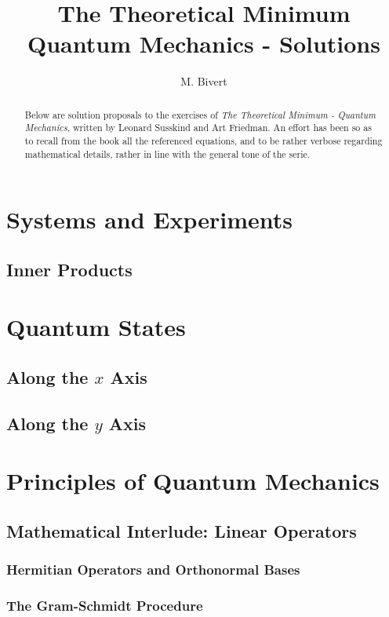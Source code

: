 \documentclass[a4paper]{article}
\author{M. Bivert}
\title{The Theoretical Minimum \\
	{\Large Quantum Mechanics - Solutions}
}
\begin{document}
\maketitle
\begin{abstract}
Below are solution proposals to the exercises of
\textit{The Theoretical Minimum - Quantum Mechanics}, written
by Leonard Susskind and Art Friedman. An effort has been
so as to recall from the book all the referenced equations,
and to be rather verbose regarding mathematical details, rather
in line with the general tone of the serie.
\end{abstract}

\tableofcontents

\section{Systems and Experiments}
\subsection{Inner Products}


\section{Quantum States}
\subsection{Along the $x$ Axis}

\subsection{Along the $y$ Axis}


\section{Principles of Quantum Mechanics}
\subsection{Mathematical Interlude: Linear Operators}
\subsubsection{Hermitian Operators and Orthonormal Bases}

\subsubsection{The Gram-Schmidt Procedure}
\end{document}
